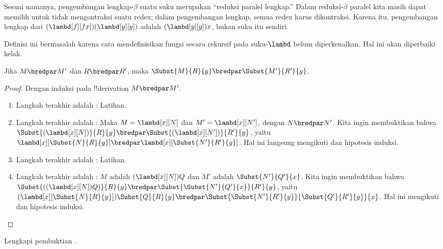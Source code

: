\documentclass[../../../include/open-logic-section]{subfiles}
\begin{document}
Sesuai namanya, pengembangan lengkap-$\beta$ suatu suku merupakan ``reduksi
paralel lengkap.'' Dalam reduksi-$\beta$ paralel kita masih dapat memilih untuk
tidak mengontraksi suatu redex; dalam pengembangan lengkap, semua redex harus
dikontraksi. Karena itu, pengembangan lengkap dari
$(\lambd[f][fx])(\lambd[y][y])$ adalah $(\lambd[y][y])x$, bukan suku itu
sendiri.

\begin{editorial}
  Definisi ini bermasalah karena cara mendefinisikan fungsi secara rekursif
  pada suku-$\lambd$ belum diperkenalkan. Hal ini akan diperbaiki kelak.
\end{editorial}

\begin{lem}
  Jika $M \bredpar M'$ dan $R \bredpar R'$, maka $\Subst{M}{R}{y}
  \bredpar \Subst{M'}{R'}{y}$.
\end{lem}

\begin{proof}
  Dengan induksi pada !!{derivation} $M \bredpar M'$.
  \begin{enumerate}
    \item Langkah terakhir adalah : Latihan.
    \item Langkah terakhir adalah : Maka
      $M=\lambd[x][N]$ dan $M'=\lambd[x][N']$, dengan $N\bredpar N'$.
      Kita ingin membuktikan bahwa
      $\Subst{(\lambd[x][N])}{R}{y}\bredpar
      \Subst{(\lambd[x][N'])}{R'}{y}$, yaitu
      $\lambd[x][\Subst{N}{R}{y}]\bredpar
      \lambd[x][\Subst{N'}{R'}{y}]$. Hal ini langsung mengikuti
       dan hipotesis induksi.
    \item Langkah terakhir adalah : Latihan.
    \item Langkah terakhir adalah : $M$ adalah
      $(\lambd[x][N])Q$ dan $M'$ adalah $\Subst{N'}{Q'}{x}$. Kita ingin
      membuktikan bahwa
      $\Subst{((\lambd[x][N])Q)}{R}{y}\bredpar
      \Subst{\Subst{N'}{Q'}{x}}{R'}{y}$, yaitu
      $(\lambd[x][\Subst{N}{R}{y}])\Subst{Q}{R}{y}\bredpar
      \Subst{\Subst{N'}{R'}{y}}{\Subst{Q'}{R'}{y}}{x}$. Hal ini mengikuti
       dan hipotesis induksi.
  \end{enumerate}
\end{proof}

\begin{prob}
  Lengkapi pembuktian .
\end{prob}
\end{document}
